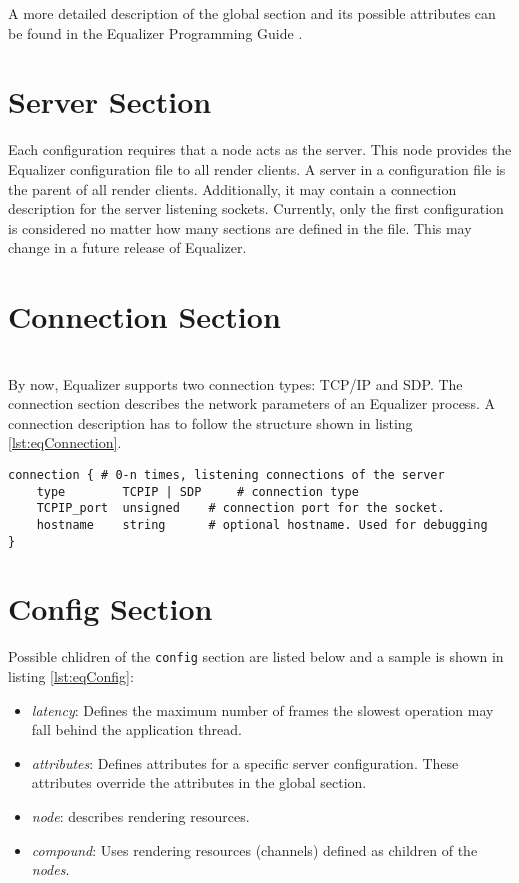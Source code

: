 A more detailed description of the global section and its possible attributes can be found in the Equalizer Programming Guide \cite[p. 60ff.]{eqPG}.

\section{Server Section}
\label{sec:appendixServerSection}
Each configuration requires that a node acts as the server. This node provides the Equalizer configuration file to all render clients. A server in a configuration file is the parent of all render clients. Additionally, it may contain a connection description for the server listening sockets.
Currently, only the first configuration is considered no matter how many sections are defined in the file. This may change in a future release of Equalizer.

\section{Connection Section}
\label{sec:appendixConnectionSection}\hfill\\
By now, Equalizer supports two connection types: TCP/IP and SDP. The connection section describes the network parameters of an Equalizer process. A connection description has to follow the structure shown in listing \ref{lst:eqConnection}.

\begin{lstlisting}[language=vrml,caption={Definition of a connection in Equalizer}, label={lst:eqConnection}]
connection { # 0-n times, listening connections of the server
	type		TCPIP | SDP 	# connection type
	TCPIP_port	unsigned	# connection port for the socket. 
	hostname	string		# optional hostname. Used for debugging
}
\end{lstlisting}

\section{Config Section}
\label{sec:appendixConfig}

Possible chlidren of the \texttt{config} section are listed below and a sample is shown in listing \ref{lst:eqConfig}:
\begin{itemize}
	\item \emph{latency}: Defines the maximum number of frames the slowest operation may fall behind the application thread.
	\item \emph{attributes}: Defines attributes for a specific server configuration. These attributes override the attributes in the global section.
	\item \emph{node}: describes rendering resources.
	\item \emph{compound}: Uses rendering resources (channels) defined as children of the \emph{nodes}.
\end{itemize}

